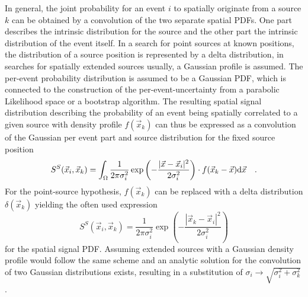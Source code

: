 In general, the joint probability for an event $i$ to spatially originate from a source $k$ can be obtained by a convolution of the two separate spatial PDFs.
One part describes the intrinsic distribution for the source and the other part the intrinsic distribution of the event itself.
In a search for point sources at known positions, the distribution of a source position is represented by a delta distribution, in searches for spatially extended sources usually, a Gaussian profile is assumed.
The per-event probability distribution is assumed to be a Gaussian PDF, which is connected to the construction of the per-event-uncertainty from a parabolic Likelihood space or a bootstrap algorithm.
The resulting spatial signal distribution describing the probability of an event being spatially correlated to a given source with density profile $f(\vec{x}_k)$ can thus be expressed as a convolution of the Gaussian per event part and source distribution for the fixed source position
\begin{equation}
  S^S(\vec{x}_i, \vec{x}_k)
  = \int_\Omega \frac{1}{2\pi \sigma_i^2}
    \exp\left(-\frac{|\vec{x}-\vec{x}_i|^2}{2\sigma_i^2}\right) \cdot
    f(\vec{x}_k - \vec{x}) \mathrm{d}\vec{x} \\
    \quad\text{.}
\end{equation}
For the point-source hypothesis, $f(\vec{x}_k)$ can be replaced with a delta distribution $\delta(\vec{x}_k)$ yielding the often used expression
\begin{equation}
  S^S(\vec{x}_i, \vec{x}_k)
  = \frac{1}{2\pi \sigma_i^2}
    \exp\left(-\frac{|\vec{x}_k-\vec{x}_i|^2}
                    {2\sigma_i^2}\right)
\end{equation}
for the spatial signal PDF.
Assuming extended sources with a Gaussian density profile would follow the same scheme and an analytic solution for the convolution of two Gaussian distributions exists, resulting in a substitution of $\sigma_i \rightarrow \sqrt{\sigma_i^2 + \sigma_k^2}$ .

